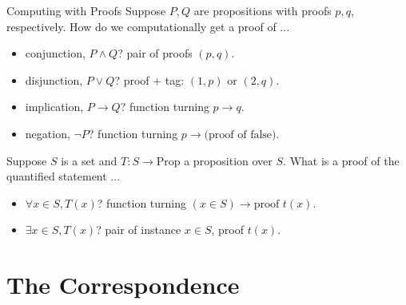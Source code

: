 \documentclass{beamer}
\begin{document}
\begin{frame}{Computing with Proofs}
 Suppose $P, Q$ are propositions with proofs $p, q$, respectively. How do we
 computationally get a proof of ...\pause 
 \begin{itemize}
   \item conjunction, $P \wedge Q$? \pause \hfill {\small pair of proofs $(p, q)$.}
     \pause
   \item disjunction, $P \vee Q$? \pause \hfill {\small proof + tag: $(1, p)$ or
   $(2, q)$.}
   \pause
 \item implication, $P \to Q$? \pause \hfill {\small function turning $p \to q$.} 
  \pause
 \item negation, $\neg P$? \pause \hfill {\small function turning $p \to
   \text{(proof of false)}$.} 
 \end{itemize}
\pause
 Suppose $S$ is a set and $T : S \to \text{Prop}$ a proposition over $S$. What
 is a proof of the quantified statement ... \pause
 \begin{itemize}
   \item  $\forall x \in S, T(x)$? \pause \hfill {\small
     function turning $(x \in S) \to \text{proof }t(x)$.}
    \pause
   \item  $\exists x \in S, T(x)$? \pause \hfill {\small
     pair of instance $x \in S$, proof $t(x)$.}
 \end{itemize}

\end{frame}


\section{The Correspondence}
\end{document}
